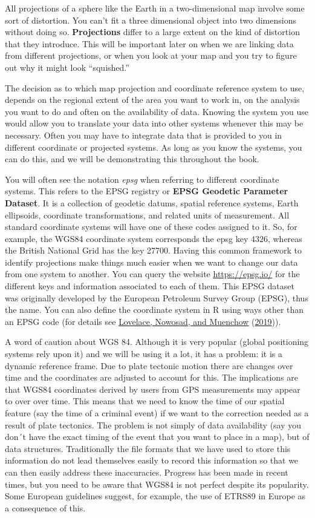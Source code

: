 \documentclass[
]{book}
\begin{document}
All projections of a sphere like the Earth in a two-dimensional map involve some sort of distortion. You can't fit a three dimensional object into two dimensions without doing so. \textbf{Projections} differ to a large extent on the kind of distortion that they introduce. This will be important later on when we are linking data from different projections, or when you look at your map and you try to figure out why it might look ``squished.''

The decision as to which map projection and coordinate reference system to use, depends on the regional extent of the area you want to work in, on the analysis you want to do and often on the availability of data. Knowing the system you use would allow you to translate your data into other systems whenever this may be necessary. Often you may have to integrate data that is provided to you in different coordinate or projected systems. As long as you know the systems, you can do this, and we will be demonstrating this throughout the book.

You will often see the notation \emph{epsg} when referring to different coordinate systems. This refers to the EPSG registry or \textbf{EPSG Geodetic Parameter Dataset}. It is a collection of geodetic datums, spatial reference systems, Earth ellipsoids, coordinate transformations, and related units of measurement. All standard coordinate systems will have one of these codes assigned to it. So, for example, the WGS84 coordinate system corresponds the epsg key 4326, whereas the British National Grid has the key 27700. Having this common framework to identify projections make things much easier when we want to change our data from one system to another. You can query the website \url{https://epsg.io/} for the different keys and information associated to each of them. This EPSG dataset was originally developed by the European Petroleum Survey Group (EPSG), thus the name. You can also define the coordinate system in R using ways other than an EPSG code (for details see \protect\hyperlink{ref-Lovelace_2019}{Lovelace, Nowosad, and Muenchow} (\protect\hyperlink{ref-Lovelace_2019}{2019})).

A word of caution about WGS 84. Although it is very popular (global positioning systems rely upon it) and we will be using it a lot, it has a problem: it is a dynamic reference frame. Due to plate tectonic motion there are changes over time and the coordinates are adjusted to account for this. The implications are that WGS84 coordinates derived by users from GPS measurements may appear to over over time. This means that we need to know the time of our spatial feature (say the time of a criminal event) if we want to the correction needed as a result of plate tectonics. The problem is not simply of data availability (say you don´t have the exact timing of the event that you want to place in a map), but of data structures. Traditionally the file formats that we have used to store this information do not lead themselves easily to record this information so that we can then easily address these inaccuracies. Progress has been made in recent times, but you need to be aware that WGS84 is not perfect despite its popularity. Some European guidelines suggest, for example, the use of ETRS89 in Europe as a consequence of this.
\end{document}
